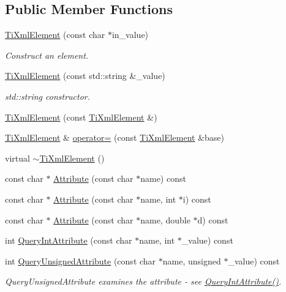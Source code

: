 \subsection*{Public Member Functions}
\begin{DoxyCompactItemize}
\item 
\hyperlink{class_ti_xml_element_a01bc3ab372d35da08efcbbe65ad90c60}{Ti\-Xml\-Element} (const char $\ast$in\-\_\-value)
\begin{DoxyCompactList}\small\item\em Construct an element. \end{DoxyCompactList}\item 
\hyperlink{class_ti_xml_element_a40fc2e3c1a955e2f78e1a32350d180e7}{Ti\-Xml\-Element} (const std\-::string \&\-\_\-value)
\begin{DoxyCompactList}\small\item\em std\-::string constructor. \end{DoxyCompactList}\item 
\hyperlink{class_ti_xml_element_a1ca4465f3c2eac6a60e641cd7f1d9f7e}{Ti\-Xml\-Element} (const \hyperlink{class_ti_xml_element}{Ti\-Xml\-Element} \&)
\item 
\hyperlink{class_ti_xml_element}{Ti\-Xml\-Element} \& \hyperlink{class_ti_xml_element_ad58d300f4cfc0016ffa6861ebb718a0b}{operator=} (const \hyperlink{class_ti_xml_element}{Ti\-Xml\-Element} \&base)
\item 
virtual \hyperlink{class_ti_xml_element_aa049a47c5081c0d021968666360da261}{$\sim$\-Ti\-Xml\-Element} ()
\item 
const char $\ast$ \hyperlink{class_ti_xml_element_ac1e4691e9375ba4e665dce7e46a50a9c}{Attribute} (const char $\ast$name) const 
\item 
const char $\ast$ \hyperlink{class_ti_xml_element_aa9192e80567b5042dbded80b78c44339}{Attribute} (const char $\ast$name, int $\ast$i) const 
\item 
const char $\ast$ \hyperlink{class_ti_xml_element_aec4f727f8aa49b51248d80125d173136}{Attribute} (const char $\ast$name, double $\ast$d) const 
\item 
int \hyperlink{class_ti_xml_element_aea0bfe471380f281c5945770ddbf52b9}{Query\-Int\-Attribute} (const char $\ast$name, int $\ast$\-\_\-value) const 
\item 
int \hyperlink{class_ti_xml_element_ae48df644f890ab86fa19839ac401f00d}{Query\-Unsigned\-Attribute} (const char $\ast$name, unsigned $\ast$\-\_\-value) const 
\begin{DoxyCompactList}\small\item\em Query\-Unsigned\-Attribute examines the attribute -\/ see \hyperlink{class_ti_xml_element_aea0bfe471380f281c5945770ddbf52b9}{Query\-Int\-Attribute()}. \end{DoxyCompactList}\item 

\end{DoxyCompactItemize}
